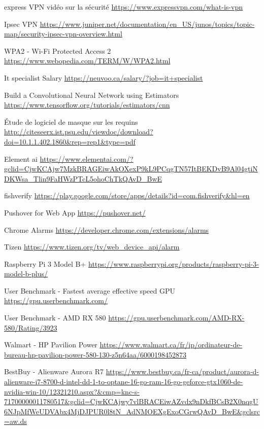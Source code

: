 \begin{thebibliographyUL}{9}
  express VPN vidéo sur la sécurité
\url{https://www.expressvpn.com/what-is-vpn}

  Ipsec VPN
\url{https://www.juniper.net/documentation/en_US/junos/topics/topic-map/security-ipsec-vpn-overview.html}

  WPA2 - Wi-Fi Protected Access 2
\url{https://www.webopedia.com/TERM/W/WPA2.html}

  It specialist Salary
\url{https://neuvoo.ca/salary/?job=it+specialist}

  Build a Convolutional Neural Network using Estimators
\url{https://www.tensorflow.org/tutorials/estimators/cnn}

  Étude de logiciel de masque sur les requins
\url{http://citeseerx.ist.psu.edu/viewdoc/download?doi=10.1.1.402.1860&rep=rep1&type=pdf}

  Element ai
\url{https://www.elementai.com/?gclid=CjwKCAjw7MzkBRAGEiwAkOXexP9kL9PCqgTN57ItBEKDvB9Al04gtiNDKWsa_Tlin9FaHWzPTcL5ohoChTkQAvD_BwE}

 fishverify
\url{https://play.google.com/store/apps/details?id=com.fishverify&hl=en}

 Pushover for Web App \url{https://pushover.net/}

 Chrome Alarms \url{https://developer.chrome.com/extensions/alarms}

 Tizen \url{https://www.tizen.org/tv/web_device_api/alarm}

 Raspberry Pi 3 Model B+ \url{https://www.raspberrypi.org/products/raspberry-pi-3-model-b-plus/}

 User Benchmark - Fastest average effective speed GPU \url{https://gpu.userbenchmark.com/}

 User Benchmark - AMD RX 580 \url{https://gpu.userbenchmark.com/AMD-RX-580/Rating/3923}

 Walmart - HP Pavilion Power \url{https://www.walmart.ca/fr/ip/ordinateur-de-bureau-hp-pavilion-power-580-130-z5n64aa/6000198452873}

 BestBuy - Alienware Aurora R7 \url{https://www.bestbuy.ca/fr-ca/product/aurora-d-alienware-i7-8700-d-intel-dd-1-to-optane-16-go-ram-16-go-geforce-gtx1060-de-nvidia-win-10/12321210.aspx?&cmp=knc-s-71700000011780517&gclid=CjwKCAjwy7vlBRACEiwAZvdx9nDkfBCsB2X0nqgU6NJpMfWeUDVAbx4MjDJPUR0l8tN_AdNMOEXgExoCGrwQAvD_BwE&gclsrc=aw.ds}


\end{thebibliographyUL}
